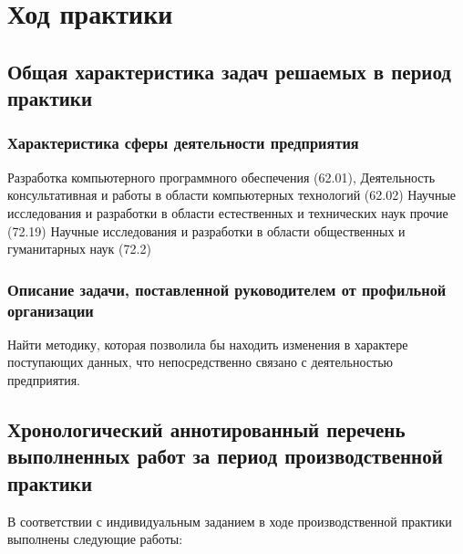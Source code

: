 \documentclass[14pt,Otchet]{diplomwork}
\begin{document}
\chapter{Ход практики}

\section{Общая характеристика задач решаемых в период практики}
\subsection{Характеристика сферы деятельности предприятия}
Разработка компьютерного программного обеспечения (62.01),
Деятельность консультативная и работы в области компьютерных технологий (62.02)
Научные исследования и разработки в области естественных и технических наук прочие (72.19)
Научные исследования и разработки в области общественных и гуманитарных наук (72.2)
\subsection{Описание задачи, поставленной руководителем от профильной организации}
Найти методику, которая позволила бы находить изменения в характере поступающих данных,
что непосредственно связано с деятельностью предприятия.

\section{Хронологический аннотированный перечень выполненных работ за период
производственной практики}
	В соответствии с индивидуальным заданием в ходе производственной практики выполнены следующие работы:
\end{document}
